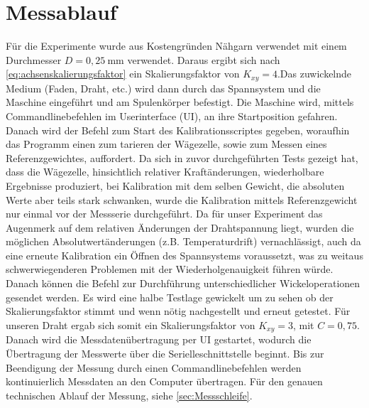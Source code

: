\section{Messablauf}
\label{sec:Messablauf}


Für die Experimente wurde aus Kostengründen Nähgarn verwendet mit einem Durchmesser $D = 0,25~\si{\milli\metre}$ verwendet. Daraus ergibt sich nach \autoref{eq:achsenskalierungsfaktor} ein Skalierungsfaktor von $K_{xy} = 4$.Das zuwickelnde Medium (Faden, Draht, etc.) wird dann durch das Spannsystem und die Maschine eingeführt und am Spulenkörper befestigt. Die Maschine wird, mittels Commandlinebefehlen im Userinterface (UI), an ihre Startposition gefahren. Danach wird der Befehl zum Start des Kalibrationsscriptes gegeben, woraufhin das Programm einen zum tarieren der Wägezelle, sowie zum Messen eines Referenzgewichtes, auffordert. Da sich in zuvor durchgeführten Tests gezeigt hat, dass die Wägezelle, hinsichtlich relativer Kraftänderungen, wiederholbare Ergebnisse produziert, bei Kalibration mit dem selben Gewicht, die absoluten Werte aber teils stark schwanken, wurde die Kalibration mittels Referenzgewicht nur einmal vor der Messserie durchgeführt. Da für unser Experiment das Augenmerk auf dem relativen Änderungen der Drahtspannung liegt, wurden die möglichen Absolutwertänderungen (z.B. Temperaturdrift) vernachlässigt, auch da eine erneute Kalibration ein Öffnen des Spannsystems voraussetzt, was zu weitaus schwerwiegenderen Problemen mit der Wiederholgenauigkeit führen würde.
Danach können die Befehl zur Durchführung unterschiedlicher Wickeloperationen gesendet werden. Es wird eine halbe Testlage gewickelt um zu sehen ob der Skalierungsfaktor stimmt und wenn nötig nachgestellt und erneut getestet. Für unseren Draht ergab sich somit ein Skalierungsfaktor von $K_{xy} = 3$, mit $C = 0,75$. Danach wird die  Messdatenübertragung per UI gestartet, wodurch die Übertragung der Messwerte über die Serielleschnittstelle beginnt. Bis zur Beendigung der Messung durch einen Commandlinebefehlen werden kontinuierlich Messdaten an den Computer übertragen. Für den genauen technischen Ablauf der Messung, siehe \autoref{sec:Messschleife}. 